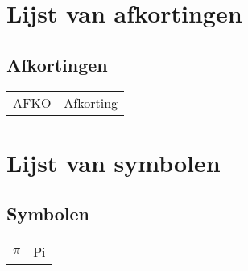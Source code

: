 

\chapter{Lijst van afkortingen}
\section*{Afkortingen}
 \begin{flushleft}
  \renewcommand{\arraystretch}{1.1}
  \begin{tabularx}{\textwidth}{@{}p{20mm}X@{}}
	AFKO & Afkorting \\
  \end{tabularx}
\end{flushleft}

\chapter{Lijst van symbolen}
\section*{Symbolen}
 \begin{flushleft}
  \renewcommand{\arraystretch}{1.1}
  \begin{tabularx}{\textwidth}{@{}p{20mm}X@{}}
  	$\pi$ & Pi \\
  \end{tabularx}
\end{flushleft}
